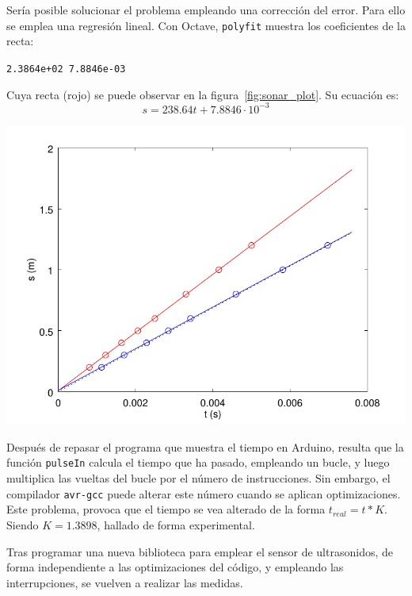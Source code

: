 \documentclass[10pt,a4paper,hidelinks]{article}
\begin{document}
\begin{multicols}{2}
Sería posible solucionar el problema empleando una corrección del error. Para 
ello se emplea una regresión lineal. Con Octave, \texttt{polyfit} muestra los 
coeficientes de la recta:
\begin{center}
\texttt{2.3864e+02   7.8846e-03}
\end{center}
Cuya recta (rojo) se puede observar en la figura~\ref{fig:sonar_plot}. Su 
ecuación es:
$$s = 238.64t + 7.8846\cdot10^{-3}$$
\begin{center}
	\includegraphics[scale=0.58]{sonar.pdf}
\end{center}

Después de repasar el programa que muestra el tiempo en Arduino, resulta que la 
función \texttt{pulseIn} calcula el tiempo que ha pasado, empleando un bucle, y 
luego multiplica las vueltas del bucle por el número de instrucciones. Sin 
embargo, el compilador \texttt{avr-gcc} puede alterar este número cuando se 
aplican optimizaciones. Este problema, provoca que el tiempo se vea alterado de 
la forma $ t_{real} = t * K $. Siendo $ K = 1.3898 $, hallado de forma 
experimental.

Tras programar una nueva biblioteca para emplear el sensor de ultrasonidos, de 
forma independiente a las optimizaciones del código, y empleando las 
interrupciones, se vuelven a realizar las medidas.



\end{multicols}
\end{document}
